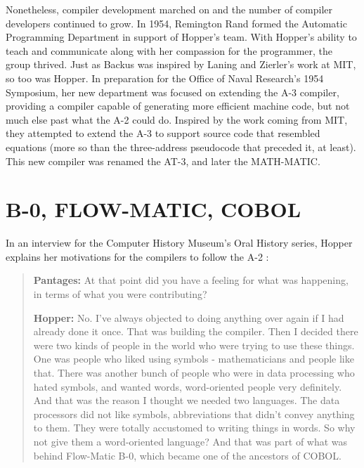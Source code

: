 Nonetheless, compiler development marched on and the number of compiler
developers continued to grow.
In 1954, Remington Rand formed the Automatic Programming Department
in support of Hopper's team.
With Hopper's ability to teach and communicate along with her compassion
for the programmer, the group thrived.
Just as Backus was inspired by Laning and Zierler's work at MIT, so too
was Hopper.
In preparation for the Office of Naval Research's 1954 Symposium,
her new department was focused on extending the A-3 compiler,
providing a compiler capable of generating more efficient machine code,
but not much else past what the A-2 could do.
Inspired by the work coming from MIT, they attempted to extend the A-3 to
support source code that resembled equations (more so than the three-address 
pseudocode that preceded it, at least).
This new compiler was renamed the AT-3, and later the MATH-MATIC.

\section{B-0, FLOW-MATIC, COBOL}

In an interview for the Computer History Museum's Oral History series,
Hopper explains her motivations for the compilers to follow the A-2
\cite{Hopper_1980_Oral_History}:

\begin{quotation}
  \textbf{Pantages:} At that point did you have a feeling for what was 
happening, in terms of what you were contributing?

  \textbf{Hopper:} No. I've always objected to doing anything over again if I had 
already done it once. That was building the compiler. Then I decided there were 
two kinds of people in the world who were trying to use these things. One was 
people who liked using symbols - mathematicians and people like that. There was 
another bunch of people who were in data processing who hated symbols, and 
wanted words, word-oriented people very definitely. And that was the reason I 
thought we needed two languages.  The data processors did not like symbols, 
abbreviations that didn't convey anything to them.  They were totally 
accustomed to writing things in words. So why not give them a word-oriented 
language? And that was part of what was behind Flow-Matic B-0, which became one 
of the ancestors of COBOL.
\end{quotation}



